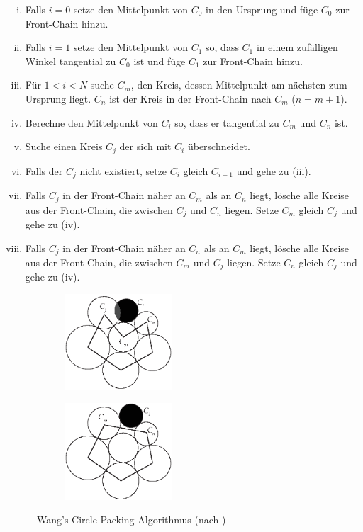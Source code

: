 \begin{enumerate}[(i), labelindent=0pt, align=left, itemsep=0pt, parsep=0pt, labelsep=.5em, leftmargin=!]
  \item Falls $i = 0$ setze den Mittelpunkt von $C_0$ in den Ursprung und füge $C_0$ zur Front-Chain hinzu.
  \item Falls $i = 1$ setze den Mittelpunkt von $C_1$ so, dass $C_1$ in einem zufälligen Winkel tangential zu $C_0$ ist und füge $C_1$ zur Front-Chain hinzu.
  \item Für $1 < i < N$ suche $C_m$, den Kreis, dessen Mittelpunkt am nächsten zum Ursprung liegt. $C_n$ ist der Kreis in der Front-Chain nach $C_m$ ($n=m+1$).
  \item Berechne den Mittelpunkt von $C_i$ so, dass er tangential zu $C_m$ und $C_n$ ist.
  \item Suche einen Kreis $C_j$ der sich mit $C_i$ überschneidet.
  \item Falls der $C_j$ nicht existiert, setze $C_i$ gleich $C_{i+1}$ und gehe zu (iii).
  \item Falls $C_j$ in der Front-Chain näher an $C_m$ als an $C_n$ liegt, lösche alle Kreise aus der Front-Chain, die zwischen $C_j$ und $C_n$ liegen. Setze $C_m$ gleich $C_j$ und gehe zu (iv).
  \item Falls $C_j$ in der Front-Chain näher an $C_n$ als an $C_m$ liegt, lösche alle Kreise aus der Front-Chain, die zwischen $C_m$ und $C_j$ liegen. Setze $C_n$ gleich $C_j$ und gehe zu (iv).
\end{enumerate}

\label{subsec:collision}\setlength{\fwidth}{.4\textwidth}
\begin{figure}[htb]
  \captionsetup{justification=centering}
  \begin{subfigure}[t]{\fwidth}
   \includegraphics[width=150px]{figures/add-circle}
    \label{fig:add-circle}
  \end{subfigure}
  \hspace{1cm}
  \begin{subfigure}[t]{\fwidth}
  	\includegraphics[width=150px]{figures/update-frontchain}
  	 \label{fig:update-frontchain}
  \end{subfigure}
  \caption{Wang's Circle Packing Algorithmus (nach \cite{bostock2017abetter})}
  \label{fig:circle-packing}
\end{figure}

